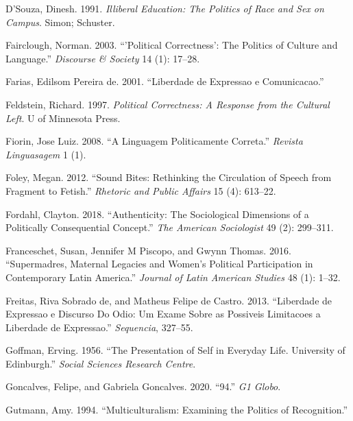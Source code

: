 \documentclass[smallextended]{svjour3}       %
\newlength{\cslhangindent}
\newlength{\cslentryspacingunit} %
\newenvironment{CSLReferences}[2] %
 {%
  \setlength{\parindent}{0pt}
  \ifodd #1
  \let\oldpar\par
  \def\par{\hangindent=\cslhangindent\oldpar}
  \fi
  \setlength{\parskip}{#2\cslentryspacingunit}
 }%
 {}
\begin{document}
\begin{CSLReferences}{1}{0}
\leavevmode{}%
D'Souza, Dinesh. 1991. \emph{Illiberal Education: The Politics of Race
and Sex on Campus}. Simon; Schuster.

\leavevmode{}%
Fairclough, Norman. 2003. {``'Political Correctness': The Politics of
Culture and Language.''} \emph{Discourse \& Society} 14 (1): 17--28.

\leavevmode{}%
Farias, Edilsom Pereira de. 2001. {``Liberdade de Expressao e
Comunicacao.''}

\leavevmode{}%
Feldstein, Richard. 1997. \emph{Political Correctness: A Response from
the Cultural Left}. U of Minnesota Press.

\leavevmode{}%
Fiorin, Jose Luiz. 2008. {``A Linguagem Politicamente Correta.''}
\emph{Revista Linguasagem} 1 (1).

\leavevmode{}%
Foley, Megan. 2012. {``Sound Bites: Rethinking the Circulation of Speech
from Fragment to Fetish.''} \emph{Rhetoric and Public Affairs} 15 (4):
613--22.

\leavevmode{}%
Fordahl, Clayton. 2018. {``Authenticity: The Sociological Dimensions of
a Politically Consequential Concept.''} \emph{The American Sociologist}
49 (2): 299--311.

\leavevmode{}%
Franceschet, Susan, Jennifer M Piscopo, and Gwynn Thomas. 2016.
{``Supermadres, Maternal Legacies and Women's Political Participation in
Contemporary Latin America.''} \emph{Journal of Latin American Studies}
48 (1): 1--32.

\leavevmode{}%
Freitas, Riva Sobrado de, and Matheus Felipe de Castro. 2013.
{``Liberdade de Expressao e Discurso Do Odio: Um Exame Sobre as
Possiveis Limitacoes a Liberdade de Expressao.''} \emph{Sequencia},
327--55.

\leavevmode{}%
Goffman, Erving. 1956. {``The Presentation of Self in Everyday Life.
University of Edinburgh.''} \emph{Social Sciences Research Centre}.

\leavevmode{}%
Goncalves, Felipe, and Gabriela Goncalves. 2020. {``94.''} \emph{G1
Globo}.

\leavevmode{}%
Gutmann, Amy. 1994. {``Multiculturalism: Examining the Politics of
Recognition.''}


\end{CSLReferences}
\end{document}

